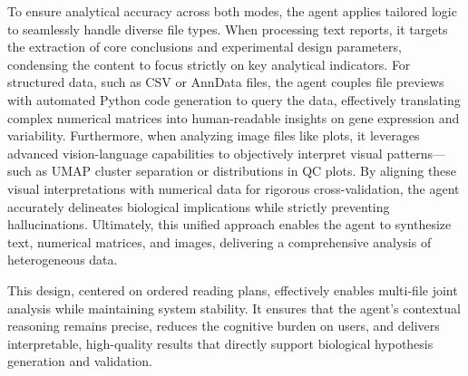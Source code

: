 \documentclass[11pt,a4paper]{article}
\begin{document}

To ensure analytical accuracy across both modes, the agent applies tailored logic to seamlessly handle diverse file types. When processing text reports, it targets the extraction of core conclusions and experimental design parameters, condensing the content to focus strictly on key analytical indicators. For structured data, such as CSV or AnnData files, the agent couples file previews with automated Python code generation to query the data, effectively translating complex numerical matrices into human-readable insights on gene expression and variability. Furthermore, when analyzing image files like plots, it leverages advanced vision-language capabilities to objectively interpret visual patterns—such as UMAP cluster separation or distributions in QC plots. By aligning these visual interpretations with numerical data for rigorous cross-validation, the agent accurately delineates biological implications while strictly preventing hallucinations. Ultimately, this unified approach enables the agent to synthesize text, numerical matrices, and images, delivering a comprehensive analysis of heterogeneous data.

This design, centered on ordered reading plans, effectively enables multi-file joint analysis while maintaining system stability. It ensures that the agent’s contextual reasoning remains precise, reduces the cognitive burden on users, and delivers interpretable, high-quality results that directly support biological hypothesis generation and validation.
\end{document}
